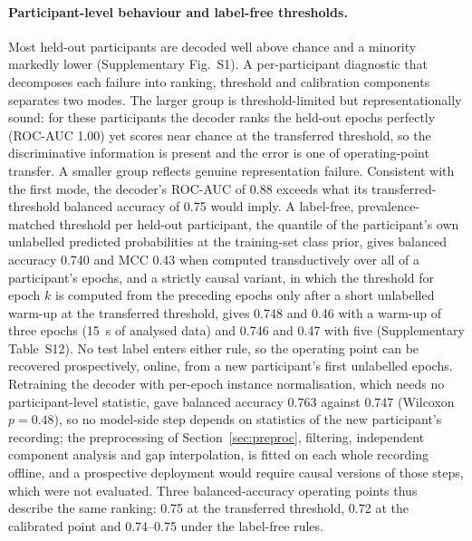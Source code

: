 \paragraph{Participant-level behaviour and label-free thresholds.} Most held-out participants are decoded well above chance and a minority markedly lower (Supplementary Fig.~S1). A per-participant diagnostic that decomposes each failure into ranking, threshold and calibration components separates two modes. The larger group is threshold-limited but representationally sound: for these participants the decoder ranks the held-out epochs perfectly (ROC-AUC 1.00) yet scores near chance at the transferred threshold, so the discriminative information is present and the error is one of operating-point transfer. A smaller group reflects genuine representation failure. Consistent with the first mode, the decoder's ROC-AUC of 0.88 exceeds what its transferred-threshold balanced accuracy of 0.75 would imply. A label-free, prevalence-matched threshold per held-out participant, the quantile of the participant's own unlabelled predicted probabilities at the training-set class prior, gives balanced accuracy 0.740 and MCC 0.43 when computed transductively over all of a participant's epochs, and a strictly causal variant, in which the threshold for epoch $k$ is computed from the preceding epochs only after a short unlabelled warm-up at the transferred threshold, gives 0.748 and 0.46 with a warm-up of three epochs (15~s of analysed data) and 0.746 and 0.47 with five (Supplementary Table~S12). No test label enters either rule, so the operating point can be recovered prospectively, online, from a new participant's first unlabelled epochs. Retraining the decoder with per-epoch instance normalisation, which needs no participant-level statistic, gave balanced accuracy 0.763 against 0.747 (Wilcoxon $p=0.48$), so no model-side step depends on statistics of the new participant's recording; the preprocessing of Section~\ref{sec:preproc}, filtering, independent component analysis and gap interpolation, is fitted on each whole recording offline, and a prospective deployment would require causal versions of those steps, which were not evaluated. Three balanced-accuracy operating points thus describe the same ranking: 0.75 at the transferred threshold, 0.72 at the calibrated point and 0.74--0.75 under the label-free rules.

